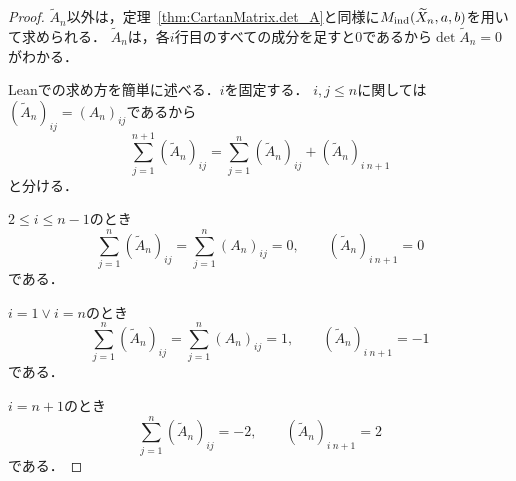 \begin{proof}
  $\widetilde{A}_n$以外は，定理~\ref{thm:CartanMatrix.det_A}と同様に$M_{\operatorname{ind}}(\widetilde{X}_n, a, b)$を用いて求められる．
  $\widetilde{A}_n$は，各$i$行目のすべての成分を足すと$0$であるから$\det \widetilde{A}_n = 0$がわかる．

  Leanでの求め方を簡単に述べる．$i$を固定する．
  $i, j \le n$に関しては$(\widetilde{A}_n)_{ij} = (A_n)_{ij}$であるから
  \begin{equation}
    \sum_{j = 1}^{n + 1} (\widetilde{A}_n)_{ij}
    = \sum_{j = 1}^{n} (\widetilde{A}_n)_{ij} + (\widetilde{A}_n)_{i\ n+1}
  \end{equation}
  と分ける．

  $2 \le i \le n-1$のとき
  \begin{equation}
    \sum_{j = 1}^{n} (\widetilde{A}_n)_{ij} = \sum_{j = 1}^{n} (A_n)_{ij} = 0, \qquad
    (\widetilde{A}_n)_{i\ n+1} = 0
  \end{equation}
  である．

  $i = 1 \lor i = n$のとき
  \begin{equation}
    \sum_{j = 1}^{n} (\widetilde{A}_n)_{ij} = \sum_{j = 1}^{n} (A_n)_{ij} = 1, \qquad
    (\widetilde{A}_n)_{i\ n+1} = -1
  \end{equation}
  である．

  $i = n + 1$のとき
  \begin{equation}
    \sum_{j = 1}^{n} (\widetilde{A}_n)_{ij} = -2, \qquad
    (\widetilde{A}_n)_{i\ n+1} = 2
  \end{equation}
  である．
\end{proof}